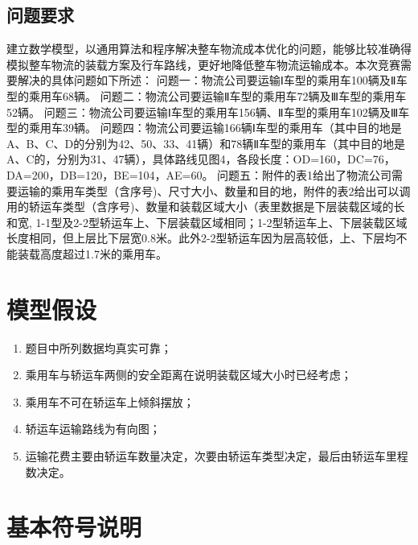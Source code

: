 \documentclass[UTF8，12pt]{ctexart}
\begin{document}


\subsection{问题要求}
建立数学模型，以通用算法和程序解决整车物流成本优化的问题，能够比较准确得模拟整车物流的装载方案及行车路线，更好地降低整车物流运输成本。本次竞赛需要解决的具体问题如下所述：
问题一：物流公司要运输Ⅰ车型的乘用车100辆及Ⅱ车型的乘用车68辆。
问题二：物流公司要运输Ⅱ车型的乘用车72辆及Ⅲ车型的乘用车52辆。
问题三：物流公司要运输Ⅰ车型的乘用车156辆、Ⅱ车型的乘用车102辆及Ⅲ车型的乘用车39辆。
问题四：物流公司要运输166辆Ⅰ车型的乘用车（其中目的地是A、B、C、D的分别为42、50、33、41辆）和78辆Ⅱ车型的乘用车（其中目的地是A、C的，分别为31、47辆），具体路线见图4，各段长度：OD=160，DC=76，DA=200，DB=120，BE=104，AE=60。
问题五：附件的表1给出了物流公司需要运输的乘用车类型（含序号)、尺寸大小、数量和目的地，附件的表2给出可以调用的轿运车类型（含序号)、数量和装载区域大小（表里数据是下层装载区域的长和宽, 1-1型及2-2型轿运车上、下层装载区域相同；1-2型轿运车上、下层装载区域长度相同，但上层比下层宽0.8米。此外2-2型轿运车因为层高较低，上、下层均不能装载高度超过1.7米的乘用车。

\section{模型假设}
\begin{enumerate}
	\item 	题目中所列数据均真实可靠；
	\item	乘用车与轿运车两侧的安全距离在说明装载区域大小时已经考虑；
	\item	乘用车不可在轿运车上倾斜摆放；
	\item	轿运车运输路线为有向图；
	\item	运输花费主要由轿运车数量决定，次要由轿运车类型决定，最后由轿运车里程数决定。

\end{enumerate}

\section{基本符号说明}
\label{sec:symbols}
\end{document}
